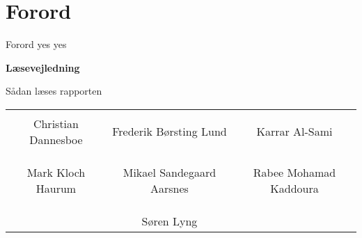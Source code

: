 \chapter*{Forord}

Forord yes yes

\textbf{Læsevejledning}

Sådan læses rapporten

\phantom{Luft}

\phantom{Luft}

\begin{table}[H]
	\centering
		\begin{tabular}{c c c}
			\underline{\phantom{mmmmmmmmmmmmmm}} & \underline{\phantom{mmmmmmmmmmmmmm}} & \underline{\phantom{mmmmmmmmmmmmmm}} \\
			Christian Dannesboe			& Frederik Børsting Lund 		& Karrar Al-Sami 			\\
			&&\\
			&&\\
			\underline{\phantom{mmmmmmmmmmmmmm}} & \underline{\phantom{mmmmmmmmmmmmmm}} & \underline{\phantom{mmmmmmmmmmmmmm}} \\
			Mark Kloch Haurum			& Mikael Sandegaard Aarsnes 		& Rabee Mohamad Kaddoura 				\\
			&&\\
			&&\\
		 							& \underline{\phantom{mmmmmmmmmmmmmm}} 	&			\\														
									& Søren Lyng 							& 												
		\end{tabular}
\end{table}